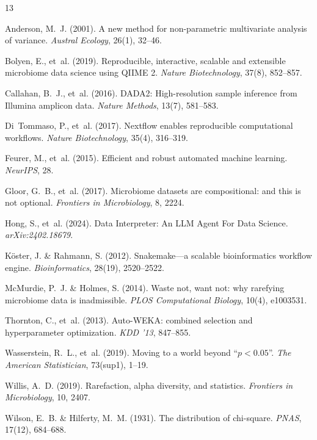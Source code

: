 \documentclass[11pt,a4paper]{article}
\begin{document}

\begin{thebibliography}{13}

Anderson, M.~J. (2001).
A new method for non-parametric multivariate analysis of variance.
\textit{Austral Ecology}, 26(1), 32--46.

Bolyen, E., et~al. (2019).
Reproducible, interactive, scalable and extensible microbiome data
science using QIIME 2.
\textit{Nature Biotechnology}, 37(8), 852--857.

Callahan, B.~J., et~al. (2016).
DADA2: High-resolution sample inference from Illumina amplicon data.
\textit{Nature Methods}, 13(7), 581--583.

Di~Tommaso, P., et~al. (2017).
Nextflow enables reproducible computational workflows.
\textit{Nature Biotechnology}, 35(4), 316--319.

Feurer, M., et~al. (2015).
Efficient and robust automated machine learning.
\textit{NeurIPS}, 28.

Gloor, G.~B., et~al. (2017).
Microbiome datasets are compositional: and this is not optional.
\textit{Frontiers in Microbiology}, 8, 2224.

Hong, S., et~al. (2024).
Data Interpreter: An LLM Agent For Data Science.
\textit{arXiv:2402.18679}.

K{\"o}ster, J. \& Rahmann, S. (2012).
Snakemake---a scalable bioinformatics workflow engine.
\textit{Bioinformatics}, 28(19), 2520--2522.

McMurdie, P.~J. \& Holmes, S. (2014).
Waste not, want not: why rarefying microbiome data is inadmissible.
\textit{PLOS Computational Biology}, 10(4), e1003531.

Thornton, C., et~al. (2013).
Auto-WEKA: combined selection and hyperparameter optimization.
\textit{KDD '13}, 847--855.

Wasserstein, R.~L., et~al. (2019).
Moving to a world beyond ``$p < 0.05$''.
\textit{The American Statistician}, 73(sup1), 1--19.

Willis, A.~D. (2019).
Rarefaction, alpha diversity, and statistics.
\textit{Frontiers in Microbiology}, 10, 2407.

Wilson, E.~B. \& Hilferty, M.~M. (1931).
The distribution of chi-square.
\textit{PNAS}, 17(12), 684--688.

\end{thebibliography}
\end{document}
